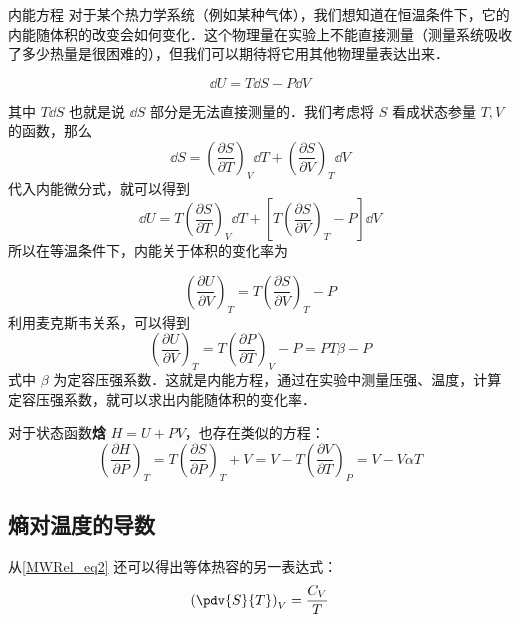 \begin{example}{内能方程}
对于某个热力学系统（例如某种气体），我们想知道在恒温条件下，它的内能随体积的改变会如何变化．这个物理量在实验上不能直接测量（测量系统吸收了多少热量是很困难的），但我们可以期待将它用其他物理量表达出来．

\begin{equation}
\dd U=T\dd S-P\dd V
\end{equation}

其中 $T\dd S$ 也就是说 $\dd S$ 部分是无法直接测量的．我们考虑将 $S$ 看成状态参量 $T,V$ 的函数，那么 
\begin{equation}
\dd S=\left(\frac{\partial S}{\partial T}\right)_V \dd T+\left(\frac{\partial S}{\partial V}\right)_T \dd V
\end{equation}
代入内能微分式，就可以得到
\begin{equation}\label{MWRel_eq2}
\dd U=T\left(\frac{\partial S}{\partial T}\right)_V\dd T+\left[T\left(\frac{\partial S}{\partial V}\right)_T-P\right]\dd V
\end{equation}
所以在等温条件下，内能关于体积的变化率为

\begin{equation}
\left(\frac{\partial U}{\partial V}\right)_T=T\left(\frac{\partial S}{\partial V}\right)_T-P
\end{equation}
利用麦克斯韦关系，可以得到
\begin{equation}
\left(\frac{\partial U}{\partial V}\right)_T=T\left(\frac{\partial P}{\partial T}\right)_V-P=PT\beta-P
\end{equation}
式中 $\beta$ 为定容压强系数．这就是内能方程，通过在实验中测量压强、温度，计算定容压强系数，就可以求出内能随体积的变化率．

对于状态函数\textbf{焓} $H=U+PV$，也存在类似的方程：
\begin{equation}\label{MWRel_eq3}
\left(\frac{\partial H}{\partial P}\right)_T=T\left(\frac{\partial S}{\partial P}\right)_T+V
=V-T\left(\frac{\partial V}{\partial T}\right)_P=V-V\alpha T
\end{equation}

\end{example}

\subsection{熵对温度的导数}
从\autoref{MWRel_eq2} 还可以得出等体热容的另一表达式：
\begin{equation}
\left(\pdv{S}{T}\right)_V=\frac{C_V}{T}
\end{equation}

